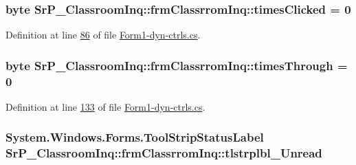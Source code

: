 \hypertarget{class_sr_p___classroom_inq_1_1frm_classrrom_inq_a8b01f872cc35c75e41502f5114a65b74}{
\subsubsection[{times\-Clicked}]{\setlength{\rightskip}{0pt plus 5cm}byte {\bf \-Sr\-P\-\_\-\-Classroom\-Inq\-::frm\-Classrrom\-Inq\-::times\-Clicked} = 0}}
\label{class_sr_p___classroom_inq_1_1frm_classrrom_inq_a8b01f872cc35c75e41502f5114a65b74}


\-Definition at line \hyperlink{_form1-dyn-ctrls_8cs_source_l00086}{86} of file \hyperlink{_form1-dyn-ctrls_8cs_source}{\-Form1-\/dyn-\/ctrls.\-cs}.

\hypertarget{class_sr_p___classroom_inq_1_1frm_classrrom_inq_ab730336bf81938256d6f20922c15484b}{
\subsubsection[{times\-Through}]{\setlength{\rightskip}{0pt plus 5cm}byte {\bf \-Sr\-P\-\_\-\-Classroom\-Inq\-::frm\-Classrrom\-Inq\-::times\-Through} = 0}}
\label{class_sr_p___classroom_inq_1_1frm_classrrom_inq_ab730336bf81938256d6f20922c15484b}


\-Definition at line \hyperlink{_form1-dyn-ctrls_8cs_source_l00133}{133} of file \hyperlink{_form1-dyn-ctrls_8cs_source}{\-Form1-\/dyn-\/ctrls.\-cs}.

\hypertarget{class_sr_p___classroom_inq_1_1frm_classrrom_inq_afe9bef57098dfe8005fc34664f678826}{
\subsubsection[{tlstrplbl\-\_\-\-Unread}]{\setlength{\rightskip}{0pt plus 5cm}\-System.\-Windows.\-Forms.\-Tool\-Strip\-Status\-Label {\bf \-Sr\-P\-\_\-\-Classroom\-Inq\-::frm\-Classrrom\-Inq\-::tlstrplbl\-\_\-\-Unread}}}
\label{class_sr_p___classroom_inq_1_1frm_classrrom_inq_afe9bef57098dfe8005fc34664f678826}


